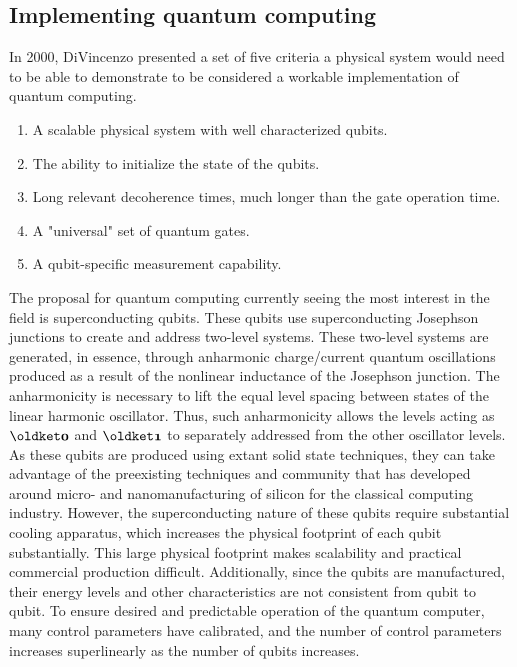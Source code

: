 \subsection{Implementing quantum computing}

In 2000, DiVincenzo presented a set of five criteria a physical system would
need to be able to demonstrate to be considered a workable implementation of quantum computing.
\begin{enumerate}
    \item A scalable physical system with well characterized qubits.
    \item The ability to initialize the state of the qubits.
    \item Long relevant decoherence times, much longer than the gate operation
    time.
    \item A "universal" set of quantum gates.
    \item A qubit-specific measurement capability.
\end{enumerate}

The proposal for quantum computing currently seeing the most interest in the
field is superconducting qubits. These qubits use superconducting Josephson
junctions to create and address two-level systems. These two-level systems are
generated, in essence, through anharmonic charge/current quantum oscillations
produced as a result of the nonlinear inductance of the Josephson junction. The
anharmonicity is necessary to lift the equal level spacing between states of the
linear harmonic oscillator. Thus, such anharmonicity allows the levels acting as
$\ket{0}$ and $\ket{1}$ to separately addressed from the other oscillator
levels\cite{UniversalQuantumSimulators,SuperconductingStateOfPlay}. As these
qubits are produced using extant solid state techniques, they can take advantage
of the preexisting techniques and community that has developed around micro- and
nanomanufacturing of silicon for the classical computing industry. However, the
superconducting nature of these qubits require substantial cooling apparatus,
which increases the physical footprint of each qubit substantially. This large
physical footprint makes scalability and practical commercial production
difficult. Additionally, since the qubits are manufactured, their energy levels
and other characteristics are not consistent from qubit to qubit. To ensure
desired and predictable operation of the quantum computer, many control
parameters have calibrated, and the number of control parameters increases
superlinearly as the number of qubits
increases\cite{SnakeOptimizerQuantumControl,SuperconductingCalibrationWithoutReset}.

